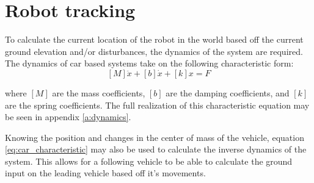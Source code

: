 \section{Robot tracking}
To calculate the current location of the robot in the world based off the current ground elevation and/or disturbances, the dynamics of the system are required. The dynamics of car based systems take on the following characteristic form:
\begin{equation} \label{eq:car_characteristic}
[M]\ddot{x}+[b]\dot{x}+[k]x=F
\end{equation}

where $[M]$ are the mass coefficients, $[b]$ are the damping coefficients, and $[k]$ are the spring coefficients. The full realization of this characteristic equation may be seen in appendix \ref{a:dynamics}.

Knowing the position and changes in the center of mass of the vehicle, equation \eqref{eq:car_characteristic} may also be used to calculate the inverse dynamics of the system. This allows for a following vehicle to be able to calculate the ground input on the leading vehicle based off it's movements.

